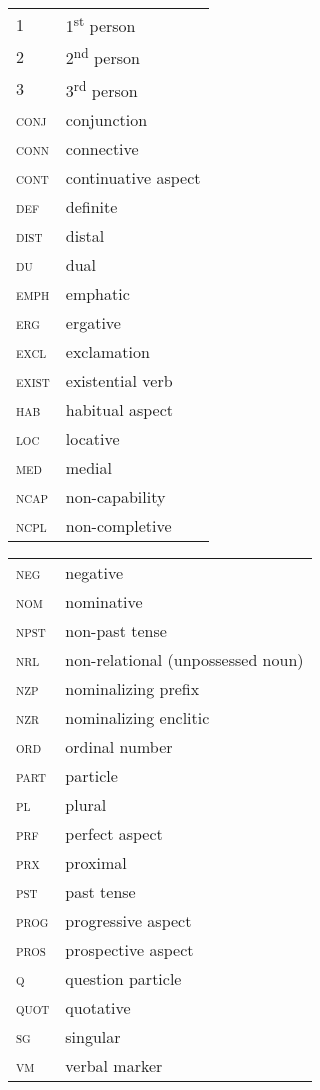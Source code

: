 \documentclass[output=paper]{LSP/langsci}
\begin{document}
\begin{tabularx}{.45\textwidth}{lQ}
1 &  1\textsuperscript{st} person\\
2  & 2\textsuperscript{nd}  person\\
3 &  3\textsuperscript{rd}  person\\
\textsc{conj} & conjunction\\
\textsc{conn} & connective\\
\textsc{cont} & continuative aspect\\
\textsc{def} & definite\\
\textsc{dist} & distal\\
\textsc{du} & dual\\
\textsc{emph} & emphatic\\
\textsc{erg} & ergative\\
\textsc{excl} & exclamation\\
\textsc{exist} & existential verb\\
\textsc{hab} & habitual aspect\\
\textsc{loc} & locative\\
\textsc{med} & medial\\
\textsc{ncap} & non-capability\\
\textsc{ncpl} & non-completive\\
\end{tabularx}
\begin{tabularx}{.54\textwidth}{lQ}
\textsc{neg} & negative\\
\textsc{nom} & nominative\\
\textsc{npst} & non-past tense\\
\textsc{nrl} & non-relational (unpossessed noun)\\
\textsc{nzp} & nominalizing prefix\\
\textsc{nzr} & nominalizing enclitic\\
\textsc{ord} & ordinal number\\
\textsc{part} & particle\\
\textsc{pl} & plural\\
\textsc{prf} & perfect aspect\\
\textsc{prx} & proximal\\
\textsc{pst} & past tense\\
\textsc{prog} & progressive aspect\\
\textsc{pros} & prospective aspect\\
\textsc{q} & question particle\\
\textsc{quot} & quotative\\
\textsc{sg} & singular\\
\textsc{vm} & verbal marker\\
\end{tabularx}

{\sloppy
\printbibliography[heading=subbibliography,notkeyword=this] 
}
\end{document}
